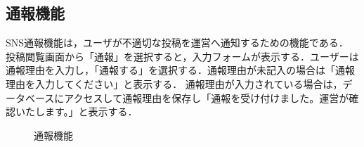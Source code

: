 \subsection{通報機能}
SNS通報機能は，ユーザが不適切な投稿を運営へ通知するための機能である．
投稿閲覧画面から「通報」を選択すると，入力フォームが表示する．ユーザーは通報理由を入力し，「通報する」を選択する．通報理由が未記入の場合は「通報理由を入力してください」と表示する．
通報理由が入力されている場合は，データベースにアクセスして通報理由を保存し「通報を受け付けました。運営が確認いたします。」と表示する．


\begin{figure}[H]
        \centering
        
        \caption{通報機能}
        \label{fig:tuho_gene}
\end{figure}

